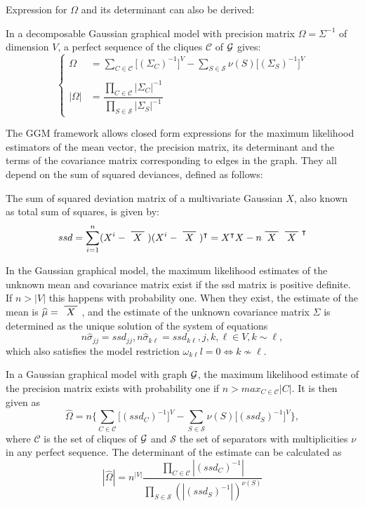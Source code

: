 Expression for $\Omega$ and its determinant can also be derived: 
 \begin{lemma} In a decomposable Gaussian graphical model with precision matrix $\Omega = \Sigma^{-1}$ of dimension $V$, a perfect sequence of the cliques $\mathcal{C}$ of $\mathcal{G}$ gives:
 \begin{equation*}
 \left\{
 \begin{array}{rl}
 \Omega &= \sum_{C\in \mathcal{C}} \big[(\Sigma_C)^{-1}\big]^V - \sum_{S\in \mathcal{S}} \nu(S)  \big[(\Sigma_S)^{-1}\big]^V \\\\
 |\Omega| &=\dfrac{\prod_{C\in \mathcal{C}} |\Sigma_C|^{-1}}{\prod_{S\in \mathcal{S}} |\Sigma_S|^{-1}}
 \end{array} \right.
\end{equation*}  
\end{lemma}

The GGM framework allows closed form expressions for the maximum likelihood estimators of the mean vector, the precision matrix, its determinant and the terms of the covariance matrix corresponding to edges in the graph. They all depend on the sum of squared deviances, defined as follows:
\begin{definition}
The sum of squared deviation matrix of a multivariate Gaussian $X$, also known as total sum of squares,  is given by:
$$ssd = \sum_{i=1}^n (X^i - \xbar{X})(X^i - \xbar{X})^\intercal = X^\intercal X - n  \xbar{X} \xbar{X}^\intercal$$
\end{definition}
\begin{theorem}
In the Gaussian graphical model,  the maximum likelihood estimates of the unknown mean and covariance matrix exist if the ssd matrix is positive definite. If $n>|V|$ this happens with probability one. When they exist, the estimate of the mean is $\widehat{\mu} = \xbar{X}$, and the estimate of the unknown covariance matrix $\Sigma$ is determined as the unique solution of the system of equations
$$n\widehat{\sigma}_{jj} = ssd_{jj}, n\widehat{\sigma}_{k\ell} = ssd_{k\ell}, j,k,\ell \in V, k\sim\ell,$$
which also satisfies the model restriction $\omega_{k\ell}l =0 \iff k\nsim \ell $.
\end{theorem}

\begin{theorem}
In a Gaussian graphical model with graph $\mathcal{G}$, the maximum likelihood estimate of the precision matrix exists with probability one if $n>max_{C\in\mathcal{C}}|C|$. It is then given as
$$\widehat{\Omega} = n \bigg\{\sum_{C\in\mathcal{C}} \big[(ssd_C)^{-1}\big]^V-\sum_{S\in\mathcal{S}} \nu(S) \big[(ssd_S)^{-1}\big]^V \bigg\},$$
where $\mathcal{C}$ is the set of cliques of $\mathcal{G}$ and $\mathcal{S}$ the set of separators with multiplicities $\nu$ in any perfect sequence. The determinant of the estimate can be calculated as
$$|\widehat{\Omega}| = n^{|V|} \dfrac{\prod_{C\in\mathcal{C}}|(ssd_C)^{-1}|}{\prod_{S\in\mathcal{S}} (|(ssd_S)^{-1}|)^{\nu(S)}}$$
\end{theorem}
 
